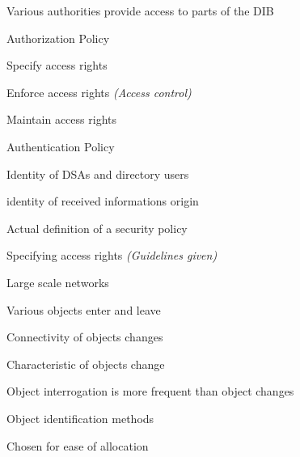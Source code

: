 \begin{bwslide}

\begin{nrtc}
\item	Various authorities provide access to parts of the DIB
\item	Authorization Policy
	\begin{nrtc}
	\item	Specify access rights
	\item	Enforce access rights {\em (Access control)}
	\item	Maintain access rights
	\end{nrtc}
\item	Authentication Policy
	\begin{nrtc}
	\item	Identity of DSAs and directory users
	\item	identity of received informations origin
	\end{nrtc}
\end{nrtc}
\end{bwslide}

\begin{bwslide}

\begin{nrtc}
\item	Actual definition of a security policy
\item	Specifying access rights {\em (Guidelines given)}
\end{nrtc}
\end{bwslide}

\begin{bwslide}
\end{bwslide}

\begin{bwslide}

\begin{nrtc}
\item	Large scale networks
	\begin{nrtc}
	\item	Various objects enter and leave
	\item	Connectivity of objects changes
	\item	Characteristic of objects change
	\end{nrtc}
\item	Object interrogation is more frequent than object changes
\item	Object identification methods
	\begin{nrtc}
	\item	Chosen for ease of allocation
	\end{nrtc}
\end{nrtc}
\end{bwslide}

